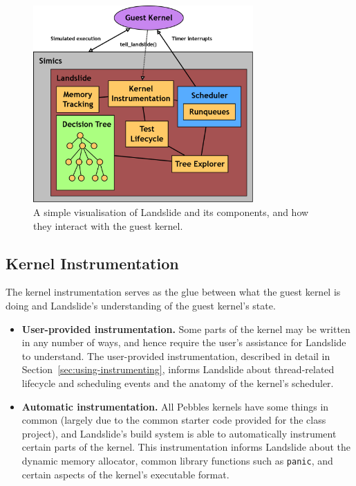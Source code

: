 \begin{figure}[h]
	\centering
	\includegraphics[width=0.75\textwidth]{landslide.png}
	\caption{A simple visualisation of Landslide and its components, and how they interact with the guest kernel.}
	\label{fig:landslide}
\end{figure}

\subsection{Kernel Instrumentation}
\label{sec:components-kern}

The kernel instrumentation serves as the glue between what the guest kernel is doing and Landslide's understanding of the guest kernel's state.

\begin{itemize}
	\item {\bf User-provided instrumentation.} Some parts of the kernel may be written in any number of ways, and hence require the user's assistance for Landslide to understand. The user-provided instrumentation, described in detail in Section~\ref{sec:using-instrumenting}, informs Landslide about thread-related lifecycle and scheduling events and the anatomy of the kernel's scheduler.
	\item {\bf Automatic instrumentation.} All Pebbles kernels have some things in common (largely due to the common starter code provided for the class project), and Landslide's build system is able to automatically instrument certain parts of the kernel. This instrumentation informs Landslide about the dynamic memory allocator, common library functions such as \texttt{panic}, and certain aspects of the kernel's executable format.
\end{itemize}

